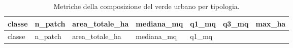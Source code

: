 \documentclass[
  a4paper,
]{book}
\begin{document}
\begin{longtable}[]{@{}
  >{\raggedright\arraybackslash}p{}
  >{\raggedleft\arraybackslash}p{}
  >{\raggedleft\arraybackslash}p{}
  >{\raggedleft\arraybackslash}p{}
  >{\raggedleft\arraybackslash}p{}
  >{\raggedleft\arraybackslash}p{}
  >{\raggedleft\arraybackslash}p{}@{}}
\caption{\label{tab:verdePatches} Metriche della composizione del verde urbano per tipologia.}\tabularnewline
\toprule\noalign{}
\begin{minipage}[b]{\linewidth}\raggedright
classe
\end{minipage} & \begin{minipage}[b]{\linewidth}\raggedleft
n\_patch
\end{minipage} & \begin{minipage}[b]{\linewidth}\raggedleft
area\_totale\_ha
\end{minipage} & \begin{minipage}[b]{\linewidth}\raggedleft
mediana\_mq
\end{minipage} & \begin{minipage}[b]{\linewidth}\raggedleft
q1\_mq
\end{minipage} & \begin{minipage}[b]{\linewidth}\raggedleft
q3\_mq
\end{minipage} & \begin{minipage}[b]{\linewidth}\raggedleft
max\_ha
\end{minipage} \\
\midrule\noalign{}
\endfirsthead
\toprule\noalign{}
\begin{minipage}[b]{\linewidth}\raggedright
classe
\end{minipage} & \begin{minipage}[b]{\linewidth}\raggedleft
n\_patch
\end{minipage} & \begin{minipage}[b]{\linewidth}\raggedleft
area\_totale\_ha
\end{minipage} & \begin{minipage}[b]{\linewidth}\raggedleft
mediana\_mq
\end{minipage} & \begin{minipage}[b]{\linewidth}\raggedleft
q1\_mq
\end{minipage} & \begin{minipage}[b]{\linewidth}\raggedleft

\end{minipage}
\end{longtable}
\end{document}
